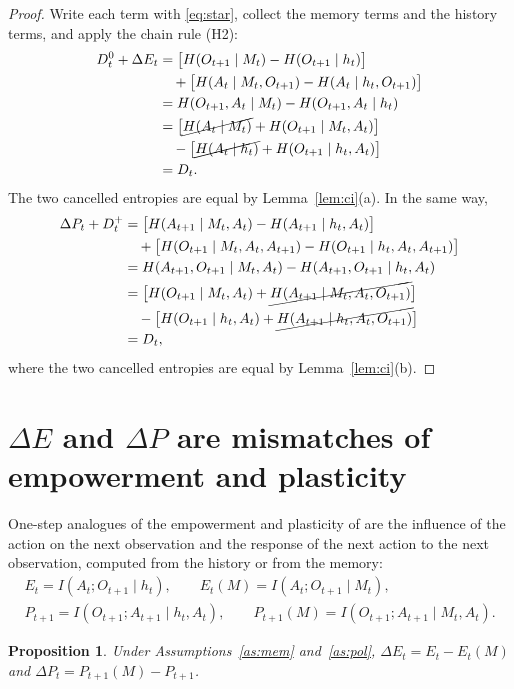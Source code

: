 \documentclass{article}
\newtheorem{proposition}{Proposition}
\theoremstyle{definition}
\theoremstyle{remark}
\newcommand{\dE}{\Delta E}
\newcommand{\dP}{\Delta P}
\begin{document}
\begin{proof}
Write each term with \eqref{eq:star}, collect the memory terms and the history terms, and apply the chain rule (H2):
\begin{align*}
D^0_t+\dE_t
&=\big[H(O_{t+1}\mid M_t)-H(O_{t+1}\mid h_t)\big]\\
&\quad+\big[H(A_t\mid M_t,O_{t+1})-H(A_t\mid h_t,O_{t+1})\big]\\
&=H(O_{t+1},A_t\mid M_t)-H(O_{t+1},A_t\mid h_t)\\
&=\big[\cancel{H(A_t\mid M_t)}+H(O_{t+1}\mid M_t,A_t)\big]\\
&\quad-\big[\cancel{H(A_t\mid h_t)}+H(O_{t+1}\mid h_t,A_t)\big]\\
&=D_t .
\end{align*}
The two cancelled entropies are equal by Lemma~\ref{lem:ci}(a). In the same way,
\begin{align*}
\dP_t+D^+_t
&=\big[H(A_{t+1}\mid M_t,A_t)-H(A_{t+1}\mid h_t,A_t)\big]\\
&\quad+\big[H(O_{t+1}\mid M_t,A_t,A_{t+1})-H(O_{t+1}\mid h_t,A_t,A_{t+1})\big]\\
&=H(A_{t+1},O_{t+1}\mid M_t,A_t)-H(A_{t+1},O_{t+1}\mid h_t,A_t)\\
&=\big[H(O_{t+1}\mid M_t,A_t)+\cancel{H(A_{t+1}\mid M_t,A_t,O_{t+1})}\big]\\
&\quad-\big[H(O_{t+1}\mid h_t,A_t)+\cancel{H(A_{t+1}\mid h_t,A_t,O_{t+1})}\big]\\
&=D_t,
\end{align*}
where the two cancelled entropies are equal by Lemma~\ref{lem:ci}(b).
\end{proof}

\section{$\dE$ and $\dP$ are mismatches of empowerment and plasticity}

One-step analogues of the empowerment and plasticity of \citet{abel2025plasticity} are the influence of the action on the next observation and the response of the next action to the next observation, computed from the history or from the memory:
\begin{gather*}
E_t=I(A_t;O_{t+1}\mid h_t),\qquad E_t(M)=I(A_t;O_{t+1}\mid M_t),\\
P_{t+1}=I(O_{t+1};A_{t+1}\mid h_t,A_t),\qquad P_{t+1}(M)=I(O_{t+1};A_{t+1}\mid M_t,A_t).
\end{gather*}

\begin{proposition}\label{prop:mismatch}
Under Assumptions~\ref{as:mem} and~\ref{as:pol}, $\dE_t=E_t-E_t(M)$ and $\dP_t=P_{t+1}(M)-P_{t+1}$.
\end{proposition}
\end{document}
